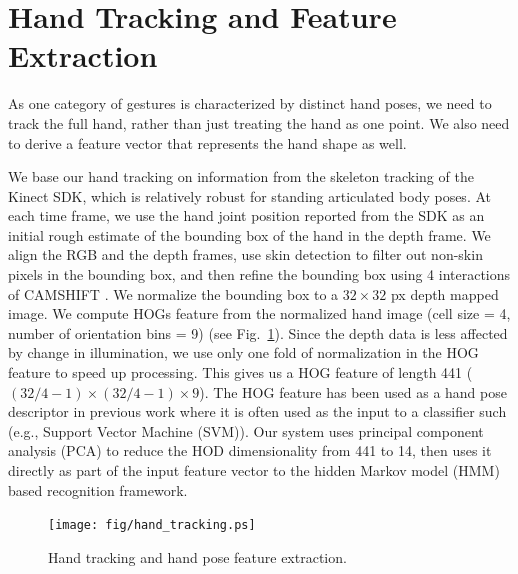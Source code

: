 \section{Hand Tracking and Feature Extraction}
As one category of gestures is characterized by distinct hand poses,
we need to track the full hand, rather than just treating the hand as one point. We
also need to derive a feature vector that represents the hand shape as well.

We base our hand tracking on information from the skeleton tracking of the
Kinect SDK, which is relatively robust for standing articulated body poses. At
each time frame, we use the hand joint position reported from the SDK as an
initial rough estimate of the bounding box of the hand in the depth frame.
We align the RGB and the depth frames, use skin detection to filter out
non-skin pixels in the bounding box, and then refine the bounding box using 4
interactions of CAMSHIFT \cite{bradski98}. We normalize the bounding box to a $32\times 32$ px depth
mapped image. We compute HOGs
feature from the normalized hand image (cell size =
4, number of orientation bins = 9) (see Fig.~\ref{fig:tracking}).
Since the depth data is less affected by change in illumination, we use only one
fold of normalization in the HOG feature to speed up processing.
This gives us a HOG feature of length 441 ($(32/4 - 1)\times (32/4 - 1)\times 9$). The HOG
feature has been used as a hand pose descriptor in previous work \cite{song12}
where it is often used as the input to a classifier such (e.g., Support Vector
Machine (SVM)). Our system uses principal component analysis (PCA)
to reduce the HOD dimensionality from 441 to 14, then uses it directly as part
of the input feature vector to the hidden Markov model (HMM) based recognition framework.

\begin{figure}[!t]
\centering
\texttt{[image: fig/hand\_tracking.ps]}
\caption{Hand tracking and hand pose feature extraction.}
\label{fig:tracking}
\end{figure}